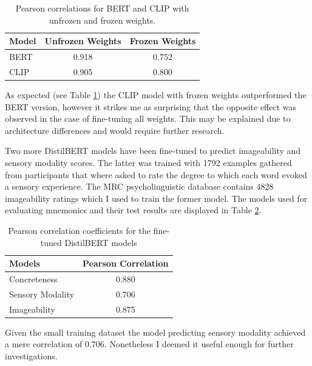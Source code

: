 \begin{table}[ht]
\centering
\begin{tabular}{@{}lcc@{}}
\toprule
Model & Unfrozen Weights & Frozen Weights \\ \midrule
BERT           & 0.918                     & 0.752                   \\
CLIP           & 0.905                     & 0.800                   \\ \bottomrule
\end{tabular}
\caption{Pearson correlations for BERT and CLIP with unfrozen and frozen weights.}
\label{tab:clip_bert_comparison}
\end{table}
As expected (see Table \ref{tab:clip_bert_comparison}) the CLIP model with frozen weights outperformed the BERT version, however it strikes me as surprising that the opposite effect was observed in the case of fine-tuning all weights. This may be explained due to architecture differences and would require further research.

Two more DistilBERT models have been fine-tuned to predict imageability and sensory modality scores. The latter was trained with 1792 examples \cite{Juhasz2013} gathered from participants that where asked to rate the degree to which each word evoked a sensory experience. The MRC psycholinguistic database \cite{mrc} contains 4828 imageability ratings which I used to train the former model. The models used for evaluating mnemonics and their test results are displayed in Table \ref{tab:linguistic_features_pearsonr}.

\begin{table}[ht]
\centering
\begin{tabular}{@{}lc@{}}
\toprule
Models          & Pearson Correlation \\ \midrule
Concreteness             & 0.880                        \\
Sensory Modality         & 0.706                        \\
Imageability             & 0.875                        \\ \bottomrule
\end{tabular}
\caption{Pearson correlation coefficients for the fine-tuned DistilBERT models}
\label{tab:linguistic_features_pearsonr}
\end{table}
Given the small training dataset the model predicting sensory modality achieved a mere correlation of $0.706$. Nonetheless I deemed it useful enough for further investigations.

